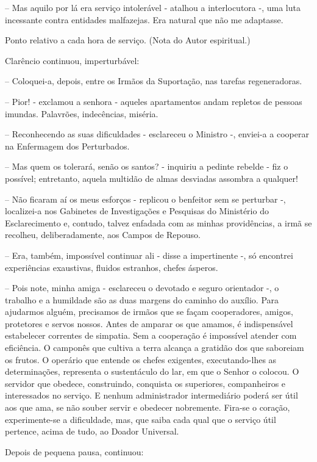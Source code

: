 \documentclass[portuguese,12pt,a4paper]{scrbook}
\begin{document}
	– Mas aquilo por lá era serviço intolerável - atalhou a interlocutora -, uma luta incessante contra entidades malfazejas. Era natural que não me adaptasse.
	
	Ponto relativo a cada hora de serviço. (Nota do Autor espiritual.)
	
	
	Clarêncio continuou, imperturbável:
	
	– Coloquei-a, depois, entre os Irmãos da Suportação, nas tarefas regeneradoras.
	
	– Pior! - exclamou a senhora - aqueles apartamentos andam repletos de pessoas imundas. Palavrões, indecências, miséria.
	
	– Reconhecendo as suas dificuldades - esclareceu o Ministro -, enviei-a a cooperar na Enfermagem dos Perturbados.
	
	– Mas quem os tolerará, senão os santos? - inquiriu a pedinte rebelde - fiz o possível; entretanto, aquela multidão de almas desviadas assombra a qualquer!
	
	– Não ficaram aí os meus esforços - replicou o benfeitor sem se perturbar -, localizei-a nos Gabinetes de Investigações e Pesquisas do Ministério do Esclarecimento e, contudo, talvez enfadada com as minhas providências, a irmã se recolheu, deliberadamente, aos Campos de Repouso.
	
	– Era, também, impossível continuar ali - disse a impertinente -, só encontrei experiências exaustivas, fluidos estranhos, chefes ásperos.
	
	– Pois note, minha amiga - esclareceu o devotado e seguro orientador -, o trabalho e a humildade são as duas margens do caminho do auxílio. Para ajudarmos alguém, precisamos de irmãos que se façam cooperadores, amigos, protetores e servos nossos. Antes de amparar os que amamos, é indispensável estabelecer correntes de simpatia. Sem a cooperação é impossível atender com eficiência. O camponês que cultiva a terra alcança a gratidão dos que saboreiam os frutos. O operário que entende os chefes exigentes, executando-lhes as determinações, representa o sustentáculo do lar, em que o Senhor o colocou. O servidor que obedece, construindo, conquista os superiores, companheiros e interessados no serviço. E nenhum administrador intermediário poderá ser útil aos que ama, se não souber servir e obedecer nobremente. Fira-se o coração, experimente-se a dificuldade, mas, que saiba cada qual que o serviço útil pertence, acima de tudo, ao Doador Universal.
	
	Depois de pequena pausa, continuou:
	
\end{document}
